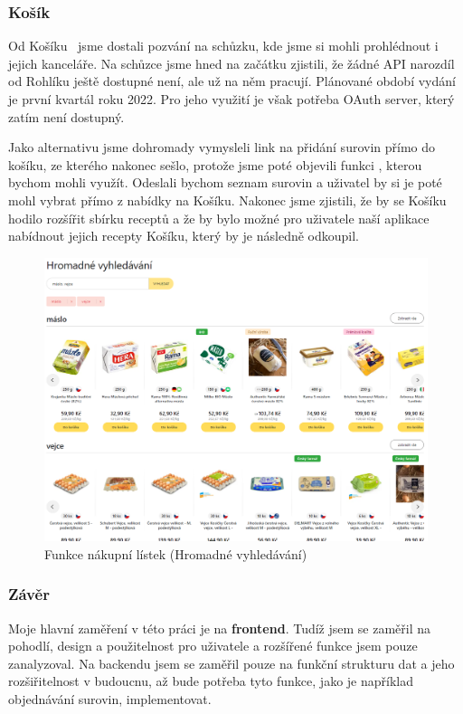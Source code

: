 \subsubsection{Košík}
Od Košíku~\cite{Kosik} jsme dostali pozvání na schůzku, kde jsme si mohli prohlédnout i jejich kanceláře. Na schůzce jsme hned na začátku
zjistili, že žádné API narozdíl od Rohlíku ještě dostupné není, ale už na něm pracují. Plánované období vydání je
první kvartál roku 2022. Pro jeho využití je však potřeba OAuth server, který zatím není dostupný.

Jako alternativu jsme dohromady vymysleli link na přidání surovin přímo do košíku, ze kterého nakonec sešlo, protože jsme
poté objevili funkci , kterou bychom mohli využít. Odeslali bychom seznam surovin a uživatel by si je poté
mohl vybrat přímo z nabídky na Košíku. Nakonec jsme zjistili, že by se Košíku hodilo rozšířit sbírku receptů a že by bylo možné
pro uživatele naší aplikace nabídnout jejich recepty Košíku, který by je následně odkoupil.

\begin{figure}[H]
    \includegraphics[width=\textwidth]{images/kosik-nakupni-listek}
    \caption{Funkce nákupní lístek (Hromadné vyhledávání)} \label{picture:kosik:nakupni-listek}
\end{figure}

\subsubsection{Závěr}
Moje hlavní zaměření v této práci je na \textbf{frontend}. Tudíž jsem se zaměřil na pohodlí, design a použitelnost pro uživatele
a rozšířené funkce jsem pouze zanalyzoval. Na backendu jsem se zaměřil pouze na funkční strukturu dat a jeho rozšiřitelnost
v budoucnu, až bude potřeba tyto funkce, jako je například objednávání surovin, implementovat.

